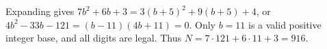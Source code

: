 Expanding gives $ 7b^2+6b+3=3(b+5)^2+9(b+5)+4 $, or $ 4b^2-33b-121=(b-11)(4b+11)=0 $. Only $ b=11 $ is a valid positive integer base, and all digits are legal. Thus $ N=7\cdot121+6\cdot11+3=\boxed{916}$.
